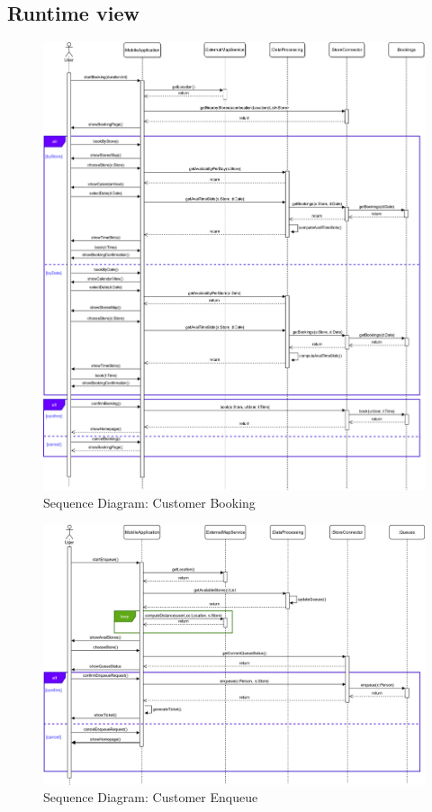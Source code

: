 \subsection{Runtime view}
\begin{figure}[H]
	\includegraphics[width=\linewidth]{../Diagrams/Sequence/sequence_customer_book.png}
	\caption{Sequence Diagram: Customer Booking}
	\label{fig:sCusBook}
\end{figure}

\begin{figure}[H]
	\includegraphics[width=\linewidth]{../Diagrams/Sequence/sequence_customer_enqueue.png}
	\caption{Sequence Diagram: Customer Enqueue}
	\label{fig:sCusEnq}
\end{figure}

